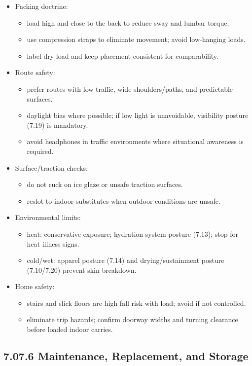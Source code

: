 \documentclass[10pt]{article}
\begin{document}
\begin{itemize}
\item Packing doctrine:
  \begin{itemize}
  \item load high and close to the back to reduce sway and lumbar torque.
  \item use compression straps to eliminate movement; avoid low-hanging loads.
  \item label dry load and keep placement consistent for comparability.
  \end{itemize}
\item Route safety:
  \begin{itemize}
  \item prefer routes with low traffic, wide shoulders/paths, and predictable surfaces.
  \item daylight bias where possible; if low light is unavoidable, visibility posture (7.19) is mandatory.
  \item avoid headphones in traffic environments where situational awareness is required.
  \end{itemize}
\item Surface/traction checks:
  \begin{itemize}
  \item do not ruck on ice glaze or unsafe traction surfaces.
  \item reslot to indoor substitutes when outdoor conditions are unsafe.
  \end{itemize}
\item Environmental limits:
  \begin{itemize}
  \item heat: conservative exposure; hydration system posture (7.13); stop for heat illness signs.
  \item cold/wet: apparel posture (7.14) and drying/sustainment posture (7.10/7.20) prevent skin breakdown.
  \end{itemize}
\item Home safety:
  \begin{itemize}
  \item stairs and slick floors are high fall risk with load; avoid if not controlled.
  \item eliminate trip hazards; confirm doorway widths and turning clearance before loaded indoor carries.
  \end{itemize}
\end{itemize}

\subsection*{7.07.6 Maintenance, Replacement, and Storage}
{}
\end{document}
